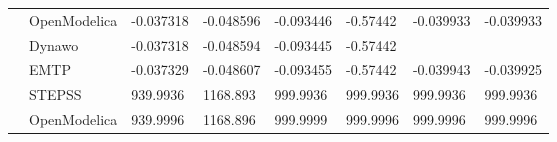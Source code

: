 \documentclass{report}
\begin{document}
\begin{table}[H]
\begin{tabular}{ll|l|l|l|l|l|l}
\multicolumn{1}{l|}{}                              & OpenModelica & -0.037318                                                                         & -0.048596                                                                         & -0.093446                                                                         & -0.57442                                                                          & -0.039933                                                                         & -0.039933                                                                        \\
\multicolumn{1}{l|}{}                              & Dynawo       & -0.037318                                                                         & -0.048594                                                                         & -0.093445                                                                         & -0.57442                                                                          &                                                                                   &                                                                                  \\
\multicolumn{1}{l|}{}                              & EMTP         & -0.037329                                                                         & -0.048607                                                                         & -0.093455                                                                         & -0.57442                                                                          & -0.039943                                                                         & -0.039925                                                                        \\ \hline
\multicolumn{1}{l|}{\parbox[t]{2mm}{}}       & STEPSS       & 939.9936                                                                          & 1168.893                                                                          & 999.9936                                                                          & 999.9936                                                                          & 999.9936                                                                          & 999.9936                                                                         \\
\multicolumn{1}{l|}{}                              & OpenModelica & 939.9996                                                                          & 1168.896                                                                          & 999.9999                                                                          & 999.9996                                                                          & 999.9996                                                                          & 999.9996                                                                         \\

\end{tabular}
\end{table}
\end{document}
